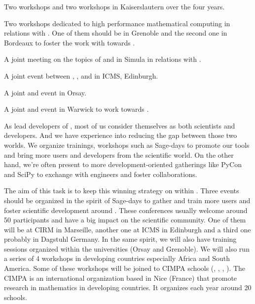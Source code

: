 \begin{workpackage}
\begin{tasklist}
\begin{task}[title=Community building: development workshops, lead=PS, partners={UB}, id=devel-workshops]
\begin{compactitem}
\item Two \Singular workshops and two \GAP workshops in Kaiserslautern
  over the four years.

\item Two workshops dedicated to high performance mathematical
  computing in relations with . One of them should be in
  Grenoble and the second one in Bordeaux to foster the work with
  \Pari towards .

\item A joint meeting on the topics of \SMC and \Jupyter in Simula in
  relations with .

\item A joint event between \GAP, \Sage, and \Singular in ICMS,
  Edinburgh.

\item A joint \Jupyter and \Sage event in Orsay.

\item A joint \LMFDB and \Sage event in Warwick to work towards
  .

\end{compactitem}


\end{task}

\begin{task}[title=Dissemination: reaching users, lead=PS, partners={UB}, id=dissemination]

As lead developers of \TheProject, most of us consider themselves as both scientists and developers.
And we have experience into reducing the gap between those two worlds. We organize trainings, workshops such as Sage-days to promote our tools and bring more users and developers from the scientific world. On the other hand, we're often present to more development-oriented gatherings like PyCon and SciPy to exchange with engineers and foster collaborations.

The aim of this task is to keep this winning strategy on within \TheProject. Three events should be organized in the spirit of Sage-days to gather and train more users and foster scientific development around \TheProject. These conferences usually welcome around 50 participants and have a big impact on the scientific community. One of them will be at CIRM in Marseille, another one at ICMS in Edinburgh and a third one probably in Dagstuhl Germany. In the same spirit, we will also have training sessions organized within the universities (Orsay and Grenoble). We will also run a series of 4 workshops in developing countries especially Africa and South America. Some of these workshops will be joined to CIMPA schools (, , , ).
The CIMPA is an international organization based in Nice (France) that promote
research in mathematics in developing countries. It organizes each year around
20 schools.


\end{task}
\end{tasklist}
\end{workpackage}
